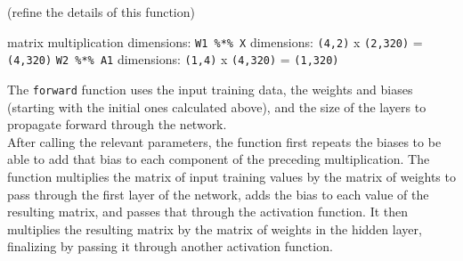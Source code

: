 (refine the details of this function)

matrix multiplication dimensions: \texttt{W1\ \%*\%\ X} dimensions:
\texttt{(4,2)} x \texttt{(2,320)} = \texttt{(4,320)}
\texttt{W2\ \%*\%\ A1} dimensions: \texttt{(1,4)} x \texttt{(4,320)} =
\texttt{(1,320)}

The \texttt{forward} function uses the input training data, the weights
and biases (starting with the initial ones calculated above), and the
size of the layers to propagate forward through the network.\\
After calling the relevant parameters, the function first repeats the
biases to be able to add that bias to each component of the preceding
multiplication. The function multiplies the matrix of input training
values by the matrix of weights to pass through the first layer of the
network, adds the bias to each value of the resulting matrix, and passes
that through the activation function. It then multiplies the resulting
matrix by the matrix of weights in the hidden layer, finalizing by
passing it through another activation function.

